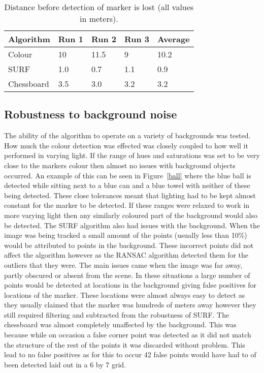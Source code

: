 \begin{table}
	\caption{Distance before detection of marker is lost (all values in meters).}
	\begin{center}
    	\begin{tabular}{ | l | l | l | l | l |}
    	\hline
    	Algorithm & Run 1 & Run 2 & Run 3 & Average \\ \hline
		Colour & 10 & 11.5 & 9 & 10.2 \\ \hline
		SURF & 1.0 & 0.7 & 1.1 & 0.9 \\ \hline
		Chessboard & 3.5 & 3.0 & 3.2 & 3.2 \\ \hline
    	\end{tabular}
	\end{center}
	\label{dist}
	
\end{table}

\subsection{Robustness to background noise}
The ability of the algorithm to operate on a variety of backgrounds was tested. How much the colour detection was effected was closely coupled to how well it performed in varying light. If the range of hues and saturations was set to be very close to the markers colour then almost no issues with background objects occurred. An example of this can be seen in Figure~\ref{ball} where the blue ball is detected while sitting next to a blue can and a blue towel with neither of these being detected. These close tolerances meant that lighting had to be kept almost constant for the marker to be detected. If these ranges were relaxed to work in more varying light then any similarly coloured part of the background would also be detected. The SURF algorithm also had issues with the background. When the image was being tracked a small amount of the points (usually less than 10\%) would be attributed to points in the background. These incorrect points did not affect the algorithm however as the RANSAC algorithm detected them for the outliers that they were. The main issues came when the image was far away, partly obscured or absent from the scene. In these situations a large number of points would be detected at locations in the background giving false positives for locations of the marker. These locations were almost always easy to detect as they usually claimed that the marker was hundreds of meters away however they still required filtering and subtracted from the robustness of SURF. The chessboard was almost completely unaffected by the background. This was because while on occasion a false corner point was detected as it did not match the structure of the rest of the points it was discarded without problem. This lead to no false positives as for this to occur 42 false points would have had to of been detected laid out in a 6 by 7 grid.

